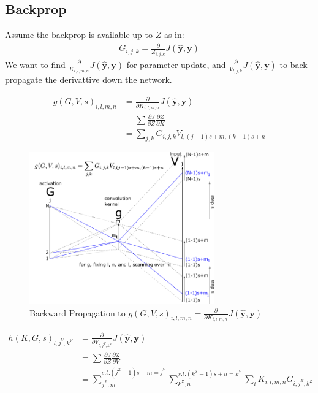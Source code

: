 \documentclass[a4]{article}
\begin{document}
\subsection{Backprop}
Assume the backprop is available up to $Z$ as in:
\begin{equation}
\begin{aligned}
G_{i,j,k} = \frac{\partial}{Z_{i,j,k}}J(\hat{\bm{y}}, \bm{y})
\end{aligned}
\end{equation}
We want to find $\frac{\partial}{K_{i,l,m,n}}J(\hat{\bm{y}}, \bm{y})$ for parameter update, and
 $\frac{\partial}{V_{l,j, k}}J(\hat{\bm{y}}, \bm{y})$ to back propagate the derivattive down
the network.

\begin{equation}
\begin{aligned}
g(G,V,s)_{i,l,m,n} &= \frac{\partial}{\partial K_{i,l,m,n}}J(\hat{\bm{y}}, \bm{y})\\
&= \sum \frac{\partial J}{\partial Z}\frac{\partial Z}{\partial K}\\
&= \sum_{j,k}G_{i, j, k}V_{l, (j-1)s+m, (k-1)s+n }
\end{aligned}
\end{equation}


\begin{figure}[!htb]
\centering
\includegraphics[width=8cm]{cnn_bp_K.png}
\caption{Backward Propagation to $g(G,V,s)_{i,l,m,n} = \frac{\partial}{\partial K_{i,l,m,n}}J(\hat{\bm{y}}, \bm{y})$}
\label{fig:cnn_bk_K}
\end{figure}


\begin{equation}
\begin{aligned}
h(K,G,s)_{l,j^V,k^V} &= \frac{\partial}{\partial V_{l,j^V,k^V}}J(\hat{\bm{y}}, \bm{y})\\
&= \sum \frac{\partial J}{\partial Z}\frac{\partial Z}{\partial V}\\
&= \sum_{j^Z,m}^{s.t.(j^Z-1)s+m=j^V}
   \sum_{k^Z,n}^{s.t.(k^Z-1)s+n=k^V}
   \sum_{i}
   K_{i, l, m, n}G_{i, j^Z, k^Z}
\end{aligned}
\end{equation}
\end{document}
